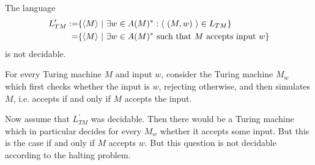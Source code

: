 \begin{Corollary}
	The language
	\begin{align*}
		L_{TM}^\prime
		:=& \{ \langle M \rangle ~|~ \exists w \in A(M)^*: \langle ~(M,w)~ \rangle \in L_{TM} \} \\
		=& \{ \langle M \rangle ~|~ \exists w \in A(M)^* ~\text{such that $M$ accepts input $w$} \}
	\end{align*}
	is not decidable.
\end{Corollary}
\proof
	For every Turing machine $M$ and input $w$, consider the Turing machine $M_w$ which first checks whether the input is $w$, rejecting otherwise, and then simulates $M$, i.e. accepts if and only if $M$ accepts the input.

	Now assume that $L_{TM}^\prime$ was decidable. Then there would be a Turing machine which in particular decides for every $M_w$ whether it accepts some input. But this is the case if and only if $M$ accepts $w$. But this question is not decidable according to the halting problem.
\endproof
